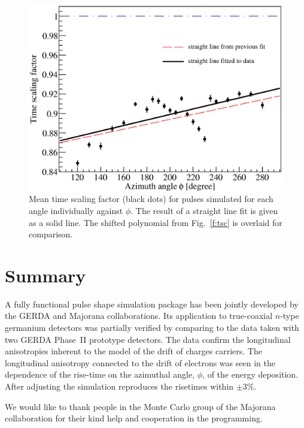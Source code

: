 \documentclass[epj]{svjour}
\begin{document}
\begin{figure}[htpb]
\centering
\includegraphics[width=\linewidth]{tsline}
\caption{Mean time scaling factor (black dots) for pulses simulated
for each angle individually against $\phi$. The result of a straight
line fit is given as a solid line. The shifted polynomial from
Fig.~\ref{f:tsc} is overlaid for comparison.}
\label{f:tsl}
\end{figure}

\section{Summary}
\label{s:sum}
A fully functional pulse shape simulation package has been jointly
developed by the GERDA and Majorana collaborations. Its application to
true-coaxial $n$-type germanium detectors was partially verified by
comparing to the data taken with two GERDA Phase~II prototype
detectors. The data confirm the longitudinal anisotropies inherent to
the model of the drift of charges carriers. The longitudinal
anisotropy connected to the drift of electrons was seen in the
dependence of the rise-time on the azimuthal angle, $\phi$, of the
energy deposition. After adjusting the simulation reproduces the
risetimes within $\pm$3\%.

\begin{acknowledgement}
We would like to thank people in the Monte Carlo group of the Majorana
collaboration for their kind help and cooperation in the programming.
\end{acknowledgement}
\end{document}
